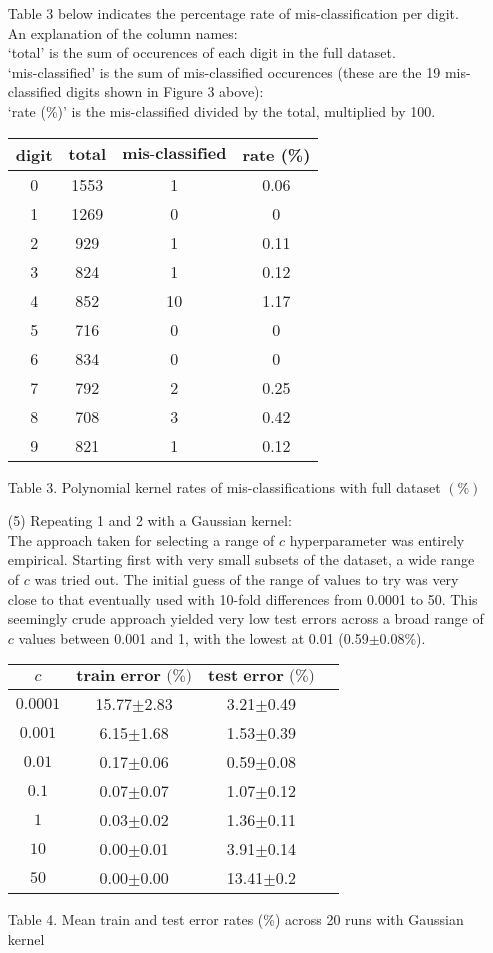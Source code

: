 \documentclass[a4paper,12pt]{article}
\begin{document}
\begin{enumerate}
Table 3 below indicates the percentage rate of mis-classification per digit. \\An explanation of the column names:\\
`total' is the sum of occurences of each digit in the full dataset. \\
`mis-classified' is the sum of mis-classified occurences (these are the 19 mis-classified digits shown in Figure 3 above):\\
`rate (\%)' is the mis-classified divided by the total, multiplied by 100. 

\begin{tabular}{|c|c|c|c|}
\hline
\textbf{digit}&$\textbf{total}$&$\textbf{mis-classified}$&\textbf{rate} (\%)\\
\hline
0&1553&1&0.06\\
\hline
1&1269&0&0\\
\hline
2&929&1&0.11\\
\hline
3&824&1&0.12\\
\hline
4&852&10&1.17\\
\hline
5&716&0&0\\
\hline
6&834&0&0\\
\hline
7&792&2&0.25\\
\hline
8&708&3&0.42\\
\hline
9&821&1&0.12\\
\hline
\end{tabular}\par 
Table 3. Polynomial kernel rates of mis-classifications with full dataset $(\%)$

\item[(5)] Repeating 1 and 2 with a Gaussian kernel: \\The approach taken for selecting a range of $c$ hyperparameter was entirely empirical. Starting first with very small subsets of the dataset, a wide range of $c$ was tried out. The initial guess of the range of values to try was very close to that eventually used with 10-fold differences from 0.0001 to 50. This seemingly crude approach yielded very low test errors across a broad range of $c$ values between 0.001 and 1, with the lowest at 0.01 (0.59$\pm$0.08\%).\\

\begin{tabular}{|c|c|c|c|}
\hline
$c$&$\textbf{train error (\%)}$&$\textbf{test error (\%)}$\\
\hline
$0.0001$&15.77$\pm$2.83&3.21$\pm$0.49\\
\hline
$0.001$&6.15$\pm$1.68&1.53$\pm$0.39\\
\hline
$0.01$&0.17$\pm$0.06&0.59$\pm$0.08\\
\hline
$0.1$&0.07$\pm$0.07&1.07$\pm$0.12\\
\hline
$1$&0.03$\pm$0.02&1.36$\pm$0.11\\
\hline
$10$&0.00$\pm$0.01&3.91$\pm$0.14\\
\hline
$50$&0.00$\pm$0.00&13.41$\pm$0.2\\
\hline
\end{tabular}\par 
Table 4. Mean train and test error rates (\%) across 20 runs with Gaussian kernel


\end{enumerate}
\end{document}
